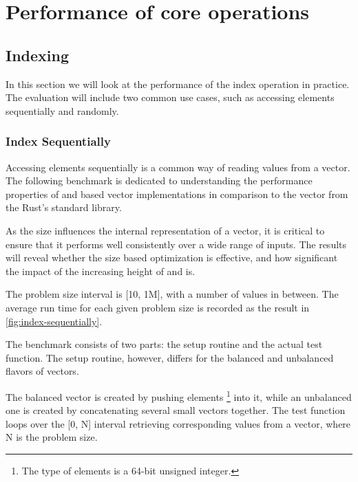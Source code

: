 \section{Performance of core operations}

\subsection{Indexing}

In this section we will look at the performance of the index operation in practice. The evaluation will include two common use cases, such as accessing elements sequentially and randomly. %

\subsubsection*{Index Sequentially}

Accessing elements sequentially is a common way of reading values from a vector. The following benchmark is dedicated to understanding the performance properties of \rbtree{} and \rrbtree{} based vector implementations in comparison to the vector from the Rust's standard library. 

As the size influences the internal representation of a vector, it is critical to ensure that it performs well consistently over a wide range of inputs. The results will reveal whether the size based optimization is effective, and how significant the impact of the increasing height of \rbtree{} and \rrbtree{} is. 

The problem size interval is [10, 1M], with a number of values in between. The average run time for each given problem size is recorded as the result in \ref{fig:index-sequentially}. 

The benchmark consists of two parts: the setup routine and the actual test function. The setup routine, however, differs for the balanced and unbalanced flavors of vectors. 

The balanced vector is created by pushing elements \footnote{The type of elements is a 64-bit unsigned integer.} into it, while an unbalanced one is created by concatenating several small vectors together. The test function loops over the [0, N] interval retrieving corresponding values from a vector, where N  is the problem size. 

